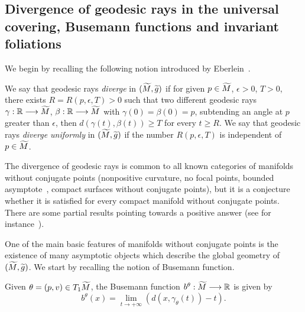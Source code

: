 \documentclass[AHL,Unicode,longabstracts,published]{cedram}
\newcommand{\bbR}{\mathbb{R}}
\let\oldtilde\tilde
\renewcommand*{\tilde}[1]{\mathchoice{\widetilde{#1}}{\widetilde{#1}}{\oldtilde{#1}}{\oldtilde{#1}}}
\begin{document}
\subsection{Divergence of geodesic rays in the universal covering, Busemann functions and invariant foliations}

We begin by recalling the following notion introduced by Eberlein~\cite{kn:Eberlein}.

\begin{defi}\label{divergence}
We say that geodesic rays \emph{diverge} in $(\tilde{M}, \tilde{g})$ if for given $p \in \tilde{M}$, $\epsilon >0$, $T>0$, there exists $R= R(p, \epsilon, T)>0$ such that two different geodesic rays $\gamma:\bbR \longrightarrow \tilde{M}$, $\beta : \bbR \longrightarrow \tilde{M}$ with $\gamma(0)= \beta(0) =p$, subtending an angle at $p$ greater than $\epsilon$, then $d(\gamma(t),\beta(t)) \geq T$ for every $t \geq R$. We say that geodesic rays \emph{diverge uniformly} in $(\tilde{M}, \tilde{g})$ if the number $R(p, \epsilon, T)$ is independent of $p \in \tilde{M}$.
\end{defi}

The divergence of geodesic rays is common to all known categories of manifolds without conjugate points (nonpositive curvature, no focal points, bounded asymptote~\cite{kn:Eschenburg}, compact surfaces without conjugate points), but it is a conjecture whether it is satisfied for every compact manifold without conjugate points. There are some partial results pointing towards a positive answer (see for instance~\cite{kn:Ruggiero-div}).

One of the main basic features of manifolds without conjugate points is the existence of many asymptotic objects which describe the global geometry of $(\tilde{M}, \tilde{g})$. We start by recalling the notion of Busemann function.

\begin{defi}\label{busemann}
Given $\theta = (p,v) \in T_{1}\tilde{M}$, the Busemann function $b^{\theta} : \tilde{M} \longrightarrow \bbR$ is given by
\[
b^{\theta}(x) = \lim_{t\rightarrow +\infty} (d(x,\gamma_{\theta}(t)) -t).
\]
\end{defi}
\end{document}
